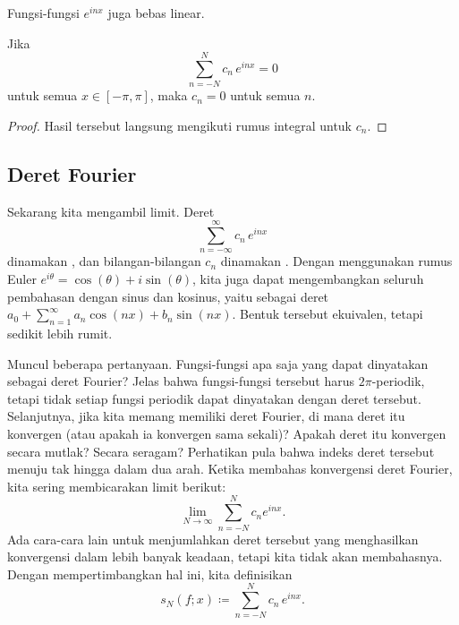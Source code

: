 Fungsi-fungsi $e^{inx}$ juga bebas linear.

\begin{prop}
Jika
\begin{equation*}
\sum_{n=-N}^N c_n \, e^{inx} = 0
\end{equation*}
untuk semua $x \in [-\pi,\pi]$, maka $c_n = 0$ untuk semua $n$.
\end{prop}

\begin{proof}
Hasil tersebut langsung mengikuti rumus integral untuk $c_n$.
\end{proof}

\subsection{Deret Fourier}

Sekarang kita mengambil limit. Deret
\begin{equation*}
\sum_{n=-\infty}^\infty c_n \, e^{inx}
\end{equation*}
dinamakan
\emph{}, dan bilangan-bilangan $c_n$
dinamakan \emph{}. Dengan menggunakan
rumus Euler $e^{i\theta} = \cos(\theta) + i \sin (\theta)$,
kita juga dapat mengembangkan seluruh pembahasan dengan
sinus dan kosinus, yaitu sebagai deret
$a_0 + \sum_{n=1}^\infty a_n \cos(nx) + b_n \sin(nx)$.
Bentuk tersebut ekuivalen, tetapi sedikit lebih rumit.

Muncul beberapa pertanyaan. Fungsi-fungsi apa saja yang dapat dinyatakan sebagai
deret Fourier? Jelas bahwa fungsi-fungsi tersebut harus $2\pi$-periodik, tetapi tidak setiap
fungsi periodik dapat dinyatakan dengan deret tersebut. Selanjutnya, jika kita memang memiliki
deret Fourier, di mana deret itu konvergen (atau apakah ia konvergen sama sekali)? Apakah deret itu konvergen
secara mutlak? Secara seragam? Perhatikan pula bahwa indeks deret tersebut menuju tak hingga
dalam dua arah. Ketika membahas konvergensi deret Fourier, kita sering
membicarakan limit berikut:
\begin{equation*}
\lim_{N\to\infty} 
\sum_{n=-N}^N c_n e^{inx} .
\end{equation*}
Ada cara-cara lain untuk menjumlahkan deret tersebut yang menghasilkan konvergensi dalam lebih banyak
keadaan, tetapi kita tidak akan membahasnya. Dengan mempertimbangkan hal ini,
kita definisikan \emph{}
\begin{equation*}
s_N(f;x) \coloneqq 
\sum_{n=-N}^N c_n \,e^{inx} .
\end{equation*}

